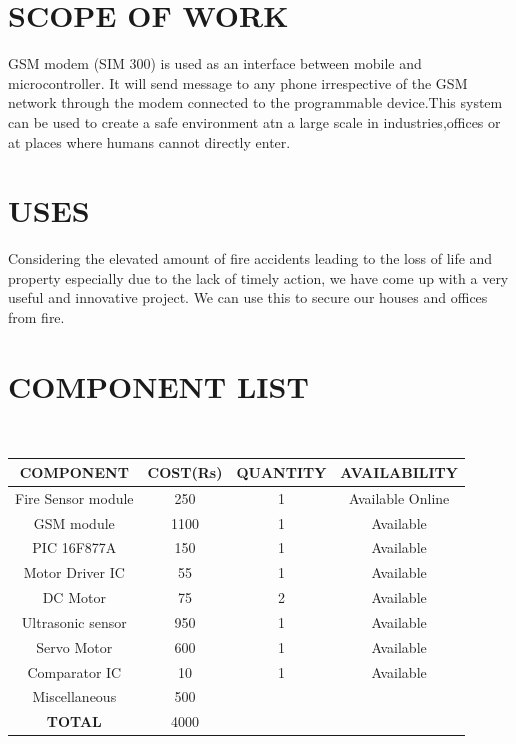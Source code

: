 \documentclass[12pt,a4paper,oneside]{report}
\begin{document}
\begin{onehalfspacing}
\newpage
\section{SCOPE OF WORK}
\par
\hspace{.7cm}
  GSM modem (SIM 300) is used as an interface between mobile and microcontroller. It will send message to any phone irrespective of the GSM network through the modem connected to the programmable device.This system can be used to create a safe environment atn a large scale in industries,offices or at places where humans cannot directly enter.\\

\section{USES}
\par
\hspace{.7cm}
Considering the elevated amount of fire accidents leading to the loss of life and property especially due to the lack of timely action, we have come up with a very useful and innovative project. We can use this to secure our houses and offices from fire. 

\section{COMPONENT LIST}
{$\;\;\;\;$}	
\begin{table}[h]
\begin{tabular}{|c|c|c|c|}
\hline
\textbf{COMPONENT} & \textbf{COST(Rs)} & \textbf{QUANTITY} & \textbf{AVAILABILITY}\\
\hline
Fire Sensor module	& 250 & 1 &	Available Online\\
GSM module	& 1100 & 1	& Available\\
PIC 16F877A &	150 & 1 &	Available\\
Motor Driver IC &	55 & 1 &	Available\\
DC Motor &	75 & 2 &	Available\\
Ultrasonic sensor & 950 & 1 & Available\\
Servo Motor & 600 & 1 & Available\\
Comparator IC &	10 & 1	& Available\\
Miscellaneous & 500 & &\\
\hline
\textbf{TOTAL}	& 4000  & &\\
\hline

\end{tabular}
\end{table}


\end{onehalfspacing}
\end{document}
